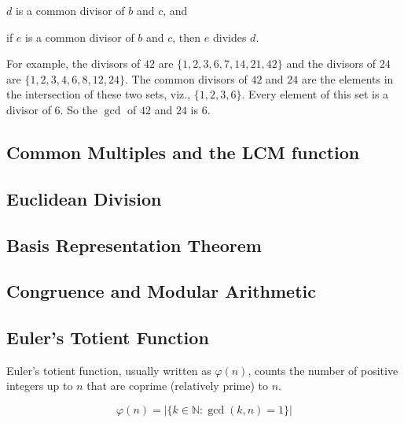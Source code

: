 \documentclass[11pt]{article}
\theoremstyle{plain}
\theoremstyle{definition}
\newenvironment{packed_items}{
\begin{itemize}
  \setlength{\itemsep}{1pt}
  \setlength{\parskip}{0pt}
  \setlength{\parsep}{0pt}
}{\end{itemize}}
\begin{document}
\begin{packed_items}
  \item $d$ is a common divisor of $b$ and $c$, and
  \item if $e$ is a common divisor of $b$ and $c$, then $e$ divides $d.$
\end{packed_items}

For example, the divisors of $42$ are $\{ 1,2,3,6,7,14,21,42 \}$ and the divisors of $24$ are $\{ 1,2,3,4,6,8,12,24 \}$. The common divisors of $42$ and $24$ are the elements in the intersection of these two sets, viz., $\{ 1,2,3,6 \}$. Every element of this set is a divisor of $6$. So the $\gcd$ of $42$ and $24$ is $6.$

\subsection*{Common Multiples and the LCM function}

\subsection*{Euclidean Division}

\subsection*{Basis Representation Theorem}

\subsection*{Congruence and Modular Arithmetic}

\subsection*{Euler's Totient Function}

Euler's totient function, usually written as $\varphi(n)$, counts the number of positive integers up to $n$ that are coprime (relatively prime) to $n$.

$$ \varphi(n) = |\{k \in \mathbb{N} : \gcd(k, n) = 1\}| $$
\end{document}
